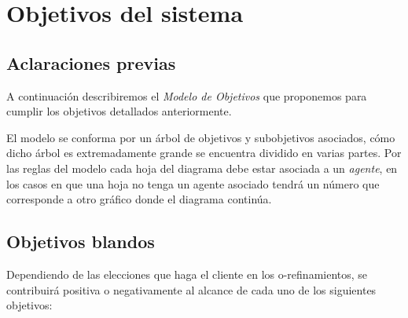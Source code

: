 \documentclass[11pt, a4paper, spanish]{article}
\begin{document}
	
\section{Objetivos del sistema}

\subsection{Aclaraciones previas}

	A continuaci\'on describiremos el \emph{Modelo de Objetivos} que proponemos para cumplir los objetivos detallados anteriormente.

	El modelo se conforma por un \'arbol de objetivos y subobjetivos asociados, c\'omo dicho \'arbol es extremadamente grande se encuentra 
	dividido en varias partes. Por las reglas del modelo cada hoja del diagrama debe estar asociada a un \emph{agente}, en los casos en que
	una hoja no tenga un agente asociado tendr\'a un n\'umero que corresponde a otro gr\'afico donde el diagrama contin\'ua.
	
\subsection{Objetivos blandos}

	Dependiendo de las elecciones que haga el cliente en los o-refinamientos, se contribuir\'a positiva o negativamente al alcance de cada uno de 
	los siguientes objetivos:
\end{document}
